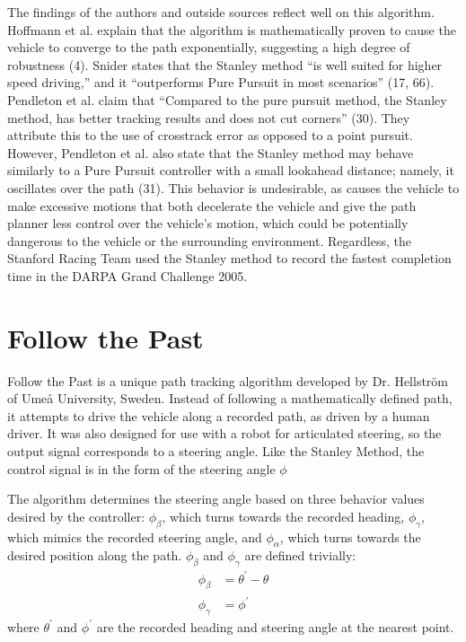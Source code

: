 \documentclass[mla7]{mla}
\begin{document}
\begin{paper}
The findings of the authors and outside sources reflect well on this algorithm. Hoffmann et al. explain that the algorithm is mathematically proven to cause the vehicle to converge to the path exponentially, suggesting a high degree of robustness (4). Snider states that the Stanley method ``is well suited for higher speed driving,'' and it ``outperforms Pure Pursuit in most scenarios'' (17, 66). Pendleton et al. claim that ``Compared to the pure pursuit method, the Stanley method, has better tracking results and does not cut corners'' (30). They attribute this to the use of crosstrack error as opposed to a point pursuit. However, Pendleton et al. also state that the Stanley method may behave similarly to a Pure Pursuit controller with a small lookahead distance; namely, it oscillates over the path (31). This behavior is undesirable, as causes the vehicle to make excessive motions that both decelerate the vehicle and give the path planner less control over the vehicle's motion, which could be potentially dangerous to the vehicle or the surrounding environment. Regardless, the Stanford Racing Team used the Stanley method to record the fastest completion time in the DARPA Grand Challenge 2005.

\section{Follow the Past}

Follow the Past is a unique path tracking algorithm developed by Dr. Hellström of Umeå University, Sweden. Instead of following a mathematically defined path, it attempts to drive the vehicle along a recorded path, as driven by a human driver. It was also designed for use with a robot for articulated steering, so the output signal corresponds to a steering angle. Like the Stanley Method, the control signal is in the form of the steering angle $\phi$ 

The algorithm determines the steering angle based on three behavior values desired by the controller: $\phi_\beta$, which turns towards the recorded heading, $\phi_\gamma$, which mimics the recorded steering angle, and $\phi_\alpha$, which turns towards the desired position along the path. $\phi_\beta$ and $\phi_\gamma$ are defined trivially:
\begin{subequations}
\begin{align}
\phi_\beta &= \theta^\prime-\theta \\
\phi_\gamma &= \phi^\prime
\end{align}
\end{subequations}
where $\theta^\prime$ and $\phi^\prime$ are the recorded heading and steering angle at the nearest point.


\end{paper}
\end{document}
